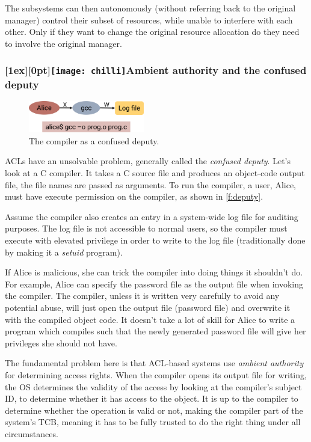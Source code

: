 \documentclass[english,a4paper,12pt]{report}
\newcommand{\SSSect}[1]{\subsubsection*{#1}}
\newcommand{\SSSect}[1]{\subsection*{#1}}
\newcommand{\chilli}{\texttt{[image: chilli]}}
\newcommand{\chilliSect}{\raisebox{-2mm}[1ex][0pt]{\chilli\hspace{0.8em}}}
\begin{document}
  The subsystems can then autonomously (without referring back to the
  original manager) control their subset of resources, while unable
  to interfere with each other. Only if they want to change the original
  resource allocation do they need to involve the original manager.

  \SSSect{\chilliSect Ambient authority and the confused deputy}

  \begin{figure}[th]
    \centering
    \includegraphics[width=0.45\textwidth]{deputy}
    \caption{The compiler as a confused deputy.}
    \label{f:deputy}
  \end{figure}

  ACLs have an unsolvable problem, generally called the \emph{confused
  deputy}. Let's look at a C compiler. It takes a C source file and
  produces an object-code output file, the file names are passed as
  arguments. To run the compiler, a user, Alice, must have execute
  permission on the compiler, as shown in \autoref{f:deputy}.

  Assume the compiler also creates an entry in a system-wide log file
  for auditing purposes. The log file is not accessible to normal
  users, so the compiler must execute with elevated privilege in order
  to write to the log file (traditionally done by making it a
  \emph{setuid} program).

  If Alice is malicious, she can trick the compiler into doing things
  it shouldn't do. For example, Alice can specify the password file as
  the output file when invoking the compiler. The compiler, unless it
  is written very carefully to avoid any potential abuse, will just
  open the output file (password file) and overwrite it with the
  compiled object code. It doesn't take a lot of skill for Alice to
  write a program which compiles such that the newly generated
  password file will give her privileges she should not have.

  The fundamental problem here is that ACL-based systems use
  \emph{ambient authority} for determining access rights. When the
  compiler opens its output file for writing, the OS determines the
  validity of the access by looking at the compiler's subject ID, to
  determine whether it has access to the object. It is up to the
  compiler to determine whether the operation is valid or not, making
  the compiler part of the system's TCB, meaning it has to be fully
  trusted to do the right thing under all circumstances.
\end{document}
